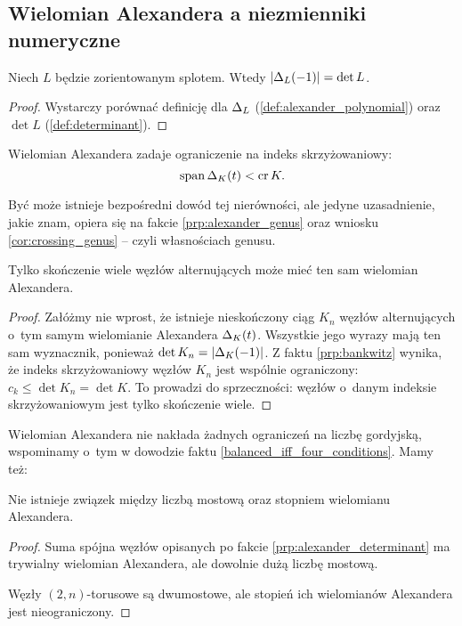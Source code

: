 
\subsection{Wielomian Alexandera a niezmienniki numeryczne}
\begin{proposition}
\label{prp:alexander_determinant}%
    Niech $L$ będzie zorientowanym splotem.
    Wtedy $|\Delta_L(-1)| = \det L$.
\end{proposition}

\begin{proof}
    Wystarczy porównać definicję dla $\Delta_L$ (\ref{def:alexander_polynomial}) oraz $\det L$ (\ref{def:determinant}).
\end{proof}

\begin{proposition}
    Wielomian Alexandera zadaje ograniczenie na indeks skrzyżowaniowy:
    \begin{equation}
        \operatorname{span} \Delta_K(t) < \operatorname{cr} K.
    \end{equation}
\end{proposition}

Być może istnieje bezpośredni dowód tej nierówności, ale jedyne uzasadnienie, jakie znam, opiera się na fakcie \ref{prp:alexander_genus} oraz wniosku \ref{cor:crossing_genus} -- czyli własnościach genusu.
%

\begin{proposition}
%
    Tylko skończenie wiele węzłów alternujących może mieć ten sam wielomian Alexandera.
\end{proposition}

\begin{proof}
    Załóżmy nie wprost, że istnieje nieskończony ciąg $K_n$ węzłów alternujących o~tym samym wielomianie Alexandera $\Delta_K(t)$.
    Wszystkie jego wyrazy mają ten sam wyznacznik, ponieważ $\det K_n = |\Delta_K(-1)|$.
    Z faktu \ref{prp:bankwitz} wynika, że indeks skrzyżowaniowy węzłów $K_n$ jest wspólnie ograniczony: $c_k \le \det K_n = \det K$.
    To prowadzi do sprzeczności: węzłów o~danym indeksie skrzyżowaniowym jest tylko skończenie wiele.
\end{proof}

Wielomian Alexandera nie nakłada żadnych ograniczeń na liczbę gordyjską, wspominamy o~tym w dowodzie faktu \ref{balanced_iff_four_conditions}.
Mamy też:

\begin{proposition}
%
\label{no_relation_bridge_alexander}%
    Nie istnieje związek między liczbą mostową oraz stopniem wielomianu Alexandera.
\end{proposition}

\begin{proof}
    Suma spójna węzłów opisanych po fakcie \ref{prp:alexander_determinant} ma trywialny wielomian Alexandera, ale dowolnie dużą liczbę mostową.

    Węzły $(2,n)$-torusowe są dwumostowe, ale stopień ich wielomianów Alexandera jest nieograniczony.
\end{proof}


